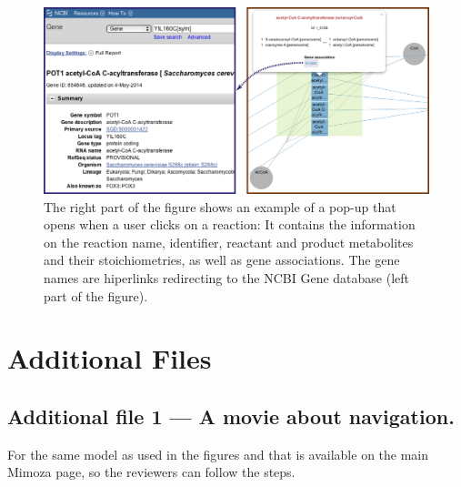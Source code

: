 \documentclass{bmcart}
\begin{document}
\begin{backmatter}
\begin{figure}[h!]
\includegraphics[scale=0.54]{figure3.png}
  \caption{
  \label{pop_up}
      The right part of the figure shows an example of a pop-up that opens when a user clicks on a reaction: It contains the information on the reaction name, identifier, reactant and product metabolites and their stoichiometries, as well as gene associations. The gene names are hiperlinks redirecting to the NCBI Gene database\cite{NCBI} (left part of the figure).}
      \end{figure}




\section*{Additional Files}
  \subsection*{Additional file 1 --- A movie about navigation.}
   For the same model as used in the figures and that is available on the main Mimoza page, so the reviewers can follow the steps.


\end{backmatter}
\end{document}
